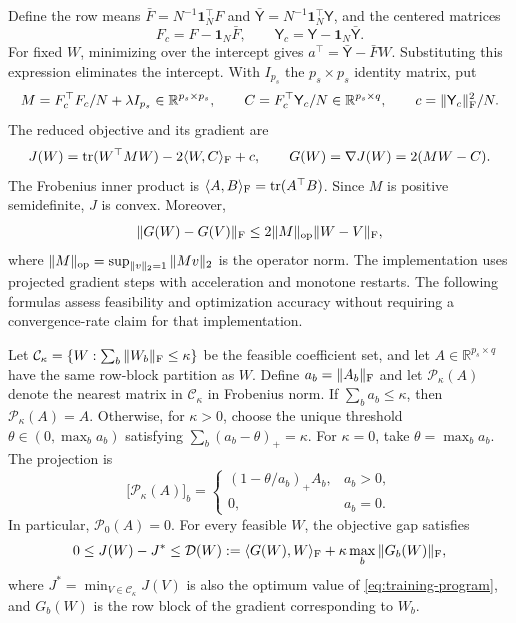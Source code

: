 Define the row means
$\bar F=N^{-1}\mathbf1_N^\top F$ and
$\bar{\mathsf Y}=N^{-1}\mathbf1_N^\top\mathsf Y$, and the centered
matrices
\[
 F_c=F-\mathbf1_N\bar F,\qquad
 \mathsf Y_c=\mathsf Y-\mathbf1_N\bar{\mathsf Y}.
\]
For fixed $W$, minimizing over the intercept gives
$a^\top=\bar{\mathsf Y}-\bar F W$. Substituting this expression
eliminates the intercept. With $I_{p_s}$ the $p_s\times p_s$ identity matrix,
put
\[
 M=F_c^\top F_c/N+\lambda I_{p_s}\in\mathbb R^{p_s\times p_s},
 \qquad C=F_c^\top\mathsf Y_c/N\in\mathbb R^{p_s\times q},
 \qquad c=\|\mathsf Y_c\|_{\rm F}^2/N.
\]
The reduced objective and its gradient are
\[
 J(W)=\operatorname{tr}(W^\top M W)
             -2\langle W,C\rangle_{\rm F}+c,
 \qquad G(W)=\nabla J(W)=2(MW-C).
\]
The Frobenius inner product is
$\langle A,B\rangle_{\rm F}=\operatorname{tr}(A^\top B)$.
Since $M$ is positive semidefinite, $J$ is convex. Moreover,
\[
 \|G(W)-G(V)\|_{\rm F}
 \leq2\|M\|_{\rm op}\|W-V\|_{\rm F},
\]
where $\|M\|_{\rm op}=\sup_{\|v\|_2=1}\|Mv\|_2$ is the operator
norm. The implementation uses projected gradient steps with acceleration
and monotone restarts. The following formulas assess feasibility and
optimization accuracy without requiring a convergence-rate claim for
that implementation.

\begin{proposition}
\label{prop:block-projection}
Let
$\mathcal C_\kappa=\{W:\sum_b\|W_b\|_{\rm F}\leq\kappa\}$
be the feasible coefficient set, and let $A\in\mathbb R^{p_s\times q}$
have the same row-block partition as $W$. Define $a_b=\|A_b\|_{\rm F}$
and let $\mathcal P_\kappa(A)$ denote the nearest matrix in
$\mathcal C_\kappa$ in Frobenius norm. If
$\sum_ba_b\leq\kappa$, then $\mathcal P_\kappa(A)=A$.
Otherwise, for $\kappa>0$, choose the unique threshold
$\theta\in(0,\max_b a_b)$ satisfying
$\sum_b(a_b-\theta)_+=\kappa$. For $\kappa=0$, take
$\theta=\max_b a_b$. The projection is
\begin{equation}
 \bigl[\mathcal P_\kappa(A)\bigr]_b
 =\begin{cases}
       (1-\theta/a_b)_+ A_b,& a_b>0,\\
       0,& a_b=0.
   \end{cases}
 \label{eq:block-projection}
\end{equation}
In particular, $\mathcal P_0(A)=0$.
For every feasible $W$, the objective gap satisfies
\begin{equation}
 0\leq J(W)-J^*
 \leq\mathcal D(W)
 :=\langle G(W),W\rangle_{\rm F}
                    +\kappa\max_b\|G_b(W)\|_{\rm F},
 \label{eq:optimization-gap}
\end{equation}
where $J^*=\min_{V\in\mathcal C_\kappa}J(V)$ is also the optimum
value of \eqref{eq:training-program}, and $G_b(W)$ is the row block of
the gradient corresponding to $W_b$.
\end{proposition}

